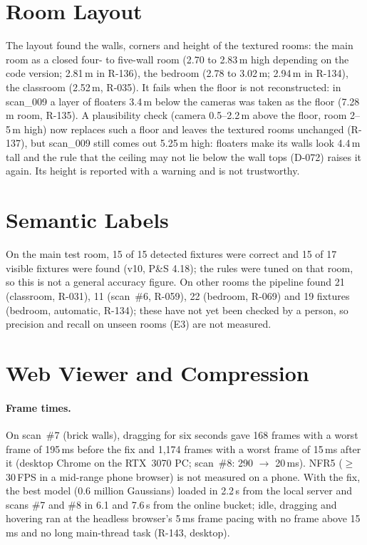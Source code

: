 \section{Room Layout}
\label{sec:eval-layout}
The layout found the walls, corners and height of the textured rooms: the main room as a closed four- to five-wall
room (2.70 to 2.83\,m high depending on the code version; 2.81\,m in R-136), the bedroom (2.78 to 3.02\,m; 2.94\,m in
R-134), the classroom (2.52\,m, R-035). It fails when the floor is not reconstructed: in scan\_009 a layer of floaters
3.4\,m below the cameras was taken as the floor (7.28\,m room, R-135). A plausibility check (camera 0.5--2.2\,m above
the floor, room 2--5\,m high) now replaces such a floor and leaves the textured rooms unchanged (R-137), but scan\_009
still comes out 5.25\,m high: floaters make its walls look 4.4\,m tall and the rule that the ceiling may not lie below
the wall tops (D-072) raises it again. Its height is reported with a warning and is not trustworthy.

\section{Semantic Labels}
On the main test room, 15 of 15 detected fixtures were correct and 15 of 17 visible fixtures were found (v10, P\&S
4.18); the rules were tuned on that room, so this is not a general accuracy figure. On other rooms the pipeline found
21 (classroom, R-031), 11 (scan~\#6, R-059), 22 (bedroom, R-069) and 19 fixtures (bedroom, automatic, R-134); these have
not yet been checked by a person, so precision and recall on unseen rooms (E3) are not measured.

\section{Web Viewer and Compression}
\paragraph{Frame times.} On scan~\#7 (brick walls), dragging for six seconds gave 168 frames
with a worst frame of 195\,ms before the fix and 1{,}174 frames with a worst frame of 15\,ms after it (desktop Chrome on
the RTX~3070 PC; scan~\#8: 290 $\rightarrow$ 20\,ms). NFR5 ($\geq$\,30\,FPS in a mid-range phone browser) is not
measured on a phone.
With the fix, the best model (0.6 million Gaussians) loaded in 2.2\,s from the local server and scans \#7 and \#8 in 6.1
and 7.6\,s from the online bucket; idle, dragging and hovering ran at the headless browser's 5\,ms frame pacing with
no frame above 15\,ms and no long main-thread task (R-143, desktop).
